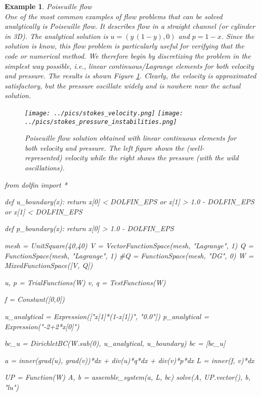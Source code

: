 \documentclass[a4paper,11pt]{amsart}
\newtheorem{example}{Example}[section]
\begin{document}
\begin{example}{Poiseuille flow} \\
One of the most common examples of flow problems that can be solved
analytically is Poiseuille flow. It describes flow in a straight
channel (or cylinder in 3D).  The analytical solution is $u=(y\,
(1-y), 0)$ and $p = 1-x$.  Since the solution is know, this flow
problem is particularly useful for verifying that the code or
numerical method. We therefore begin by discretizing the problem in
the simplest way possible, i.e., linear continuous/Lagrange elements
for both velocity and pressure. The results is shown Figure
\ref{fig:stokes1}. Clearly, the velocity is approximated satisfactory,
but the pressure oscillate widely and is nowhere near the actual
solution.
\begin{figure}
\begin{center}
\texttt{[image: ../pics/stokes\_velocity.png]}
\texttt{[image: ../pics/stokes\_pressure\_instabilities.png]}
\caption{Poiseuille flow solution obtained with linear continuous elements for
both velocity and pressure. The left figure shows the (well-represented) velocity while the right shows
the pressure (with the wild oscillations).}
\label{fig:stokes1}
\end{center}
\end{figure}

\begin{python}
from dolfin import *

def u_boundary(x):
  return x[0] < DOLFIN_EPS or x[1] > 1.0 - DOLFIN_EPS or x[1] < DOLFIN_EPS

def p_boundary(x):
  return  x[0] > 1.0 - DOLFIN_EPS

mesh = UnitSquare(40,40)
V = VectorFunctionSpace(mesh, "Lagrange", 1)
Q = FunctionSpace(mesh, "Lagrange", 1)
#Q = FunctionSpace(mesh, "DG", 0)
W = MixedFunctionSpace([V, Q])

u, p = TrialFunctions(W)
v, q = TestFunctions(W)

f = Constant([0,0])

u_analytical = Expression(["x[1]*(1-x[1])", "0.0"])
p_analytical = Expression("-2+2*x[0]")

bc_u = DirichletBC(W.sub(0), u_analytical, u_boundary)
bc = [bc_u]

a = inner(grad(u), grad(v))*dx + div(u)*q*dx + div(v)*p*dx
L = inner(f, v)*dx

UP = Function(W)
A, b = assemble_system(a, L, bc)
solve(A, UP.vector(), b, "lu")


\end{python}
\end{example}
\end{document}
